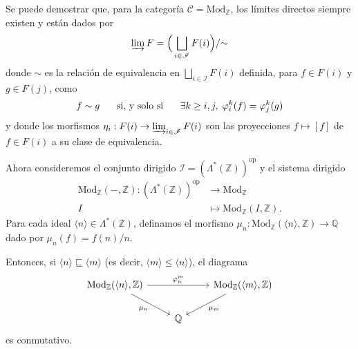 \documentclass[12pt,letterpaper,titlepage]{article}
\theoremstyle{definition}
\renewcommand\phi{\varphi}
\newcommand\Z{\mathbb Z}
\newcommand\Q{\mathbb Q}
\renewcommand\cal[1]{\mathcal{#1}}
\newcommand\nti[1]{\Lambda^{\text{*}}({#1})}
\newcommand\scr[1]{\mathscr{#1}}
\newcommand\simr{{\sim}}
\newcommand\ssi{\hspace{5mm}\text{ si, y solo si }\hspace{5mm}}
\newcommand\<{\langle}
\renewcommand\>{\rangle}
\newcommand{\Mod}{\mathrm{Mod}}
\newcommand{\op}{\mathrm{op}}
\begin{document}
Se puede demostrar que, para la categoría $\cal C=\Mod_\Z$,
los límites directos siempre existen
y están dados por
\[
    \varinjlim F = \Big(\bigsqcup_{i\in\scr I}F(i)\Big)/\simr
\]
donde $\simr$ es la relación de equivalencia en
$\bigsqcup_{i\in\scr I}F(i)$ definida, para $f\in F(i)$ y $g\in F(j)$,
como
\[
    f\sim g
    \ssi
    \exists k\geq i,j,\; \phi_i^k(f)=\phi_j^k(g)
\]
y donde los morfismos $\eta_i:F(i)\to\varinjlim_{i\in\scr I}F(i)$
son las proyecciones $f\mapsto [f]$ de $f\in F(i)$ a su clase
de equivalencia.

Ahora consideremos el conjunto dirigido $\scr I=(\nti\Z)^\op$
y el sistema dirigido
\begin{align*}
    \Mod_\Z(-,\Z):(\nti\Z)^\op&\to\Mod_\Z \\
    I&\mapsto \Mod_\Z(I,\Z).
\end{align*}
Para cada ideal $\<n\>\in\nti\Z$, definamos el morfismo
$\mu_n:\Mod_\Z(\<n\>,\Z)\to\Q$ dado por $\mu_n(f)=f(n)/n$.

Entonces, si $\<n\>\sqsubseteq \<m\>$ (es decir, $\<m\>\leq\<n\>$),
el diagrama
\[
    \begin{tikzcd}
      \Mod_\Z(\<n\>,\Z) \ar[rr,"{\phi_n^m}"] \ar[dr,"\mu_n"']
      && \Mod_\Z(\<m\>,\Z) \ar[dl,"\mu_m"] \\
      & \Q
    \end{tikzcd}
\]
es conmutativo.
\end{document}
